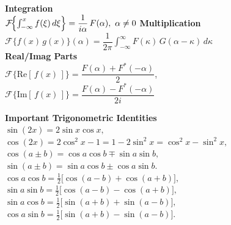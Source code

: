 \documentclass[8pt]{article}
\begin{document}
\begin{multicols}{2}
\begin{multicols}{2}
    \textbf{Integration} \\
    $\mathcal{F}\!\Bigl\{\int_{-\infty}^x f(\xi)\,d\xi\Bigr\}
        = \dfrac{1}{i \alpha}\,F(\alpha),\ \alpha\neq 0$
    \textbf{Multiplication} \\
    $\mathcal{F}\{f(x)\,g(x)\}(\alpha)
      = \dfrac{1}{2\pi}\!\int_{-\infty}^{\infty}
        F(\kappa)\,G(\alpha - \kappa)\,d\kappa$\\
    \textbf{Real/Imag Parts} \\
    $\mathcal{F}\{\text{Re}[\,f(x)\,]\}
      = \dfrac{F(\alpha) + F^*(-\alpha)}{2}$,\\
      $\mathcal{F}\{\text{Im}[\,f(x)\,]\}
      = \dfrac{F(\alpha) - F^*(-\alpha)}{2i}$
\end{multicols}
\noindent \textbf{Important Trigonometric Identities} \\
$\sin(2x) = 2\sin x\cos x,$\\
$\cos(2x) = 2\cos^2 x - 1 = 1 - 2\sin^2 x = \cos^2 x - \sin^2 x,$\\
$\cos(a \pm b) = \cos a\cos b \mp \sin a\sin b,$\\
$\sin(a \pm b) = \sin a\cos b \pm \cos a\sin b.$\\
$\cos a\cos b = \tfrac{1}{2}\bigl[\cos(a - b) + \cos(a + b)\bigr],$ \\
$\sin a\sin b = \tfrac{1}{2}\bigl[\cos(a - b) - \cos(a + b)\bigr],$ \\
$\sin a\cos b = \tfrac{1}{2}\bigl[\sin(a + b) + \sin(a - b)\bigr],$ \\
$\cos a\sin b = \tfrac{1}{2}\bigl[\sin(a + b) - \sin(a - b)\bigr].$

\normalsize
\end{multicols}
\endgroup
\end{document}
